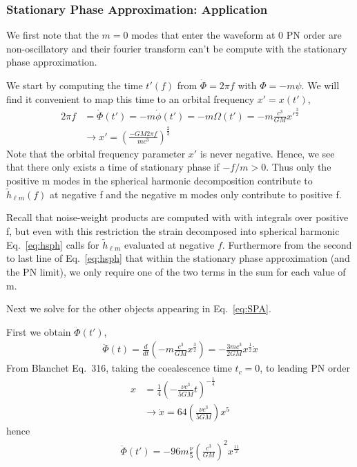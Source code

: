 \documentclass[aps,prd,amsmath,showpacs,amssymb,superscriptaddress,nofootinbib,longbibliography,eqsecnum,preprintnumbers]{revtex4-1}
\begin{document}
\subsubsection{Stationary Phase Approximation: Application}
We first note that the $m=0$ modes that enter the waveform at 0 PN order are non-oscillatory and their fourier transform can't be compute with the stationary phase approximation.

We start by computing the time $t'(f)$ from $\dot \Phi =2\pi f$ with $\Phi =-m\psi$. We will find it convenient to map this time to an orbital frequency $x'=x(t')$,
\begin{align}
2\pi f &=\dot \Phi(t') =-m \dot \phi(t') =-m \Omega(t') =-m \frac{c^3}{GM}x'^{\frac{3}{2}} \nonumber \\
&\to x'=\left(\frac{-GM 2\pi f}{mc^3}\right)^{\frac{2}{3}}
\end{align}
Note that the orbital frequency parameter $x'$ is never negative. Hence, we see that there only exists a time of stationary phase if $-f/m>0$. Thus only the positive m modes in the spherical harmonic decomposition contribute to $\tilde h_{\ell m}(f)$ at negative f and the negative m modes only contribute to positive f.

Recall that noise-weight products are computed with with integrals over positive f, but even with this restriction the strain decomposed into spherical harmonic Eq.~\eqref{eq:hsph} calls for $\tilde h_{\ell m}$ evaluated at negative $f$. Furthermore from the second to last line of Eq.~\eqref{eq:hsph} that within the stationary phase approximation (and the PN limit), we only require one of the two terms in the sum for each value of m.

Next we solve for the other objects appearing in Eq.~\eqref{eq:SPA}.

First we obtain $\ddot \Phi(t')$,
\begin{align}
\ddot \Phi(t)=\frac{d}{dt}\left(-m\frac{c^3}{GM}x^{\frac{3}{2}}\right)=-\frac{3mc^3}{2GM}x^{\frac{1}{2}}\dot x
\end{align}
From Blanchet Eq.~316, taking the coealescence time $t_c=0$, to leading PN order 
\begin{align}
x&=\frac{1}{4}\left( -\frac{\nu c^3}{5GM}t\right)^{-\frac{1}{4}} \label{eq:xt} \\
&\to \dot x=64\left(\frac{\nu c^3}{5GM}\right)x^5
\end{align}
hence
\begin{align}
\ddot \Phi(t')=-96m\frac{\nu}{5}\left(\frac{c^3}{GM}\right)^2x^{\frac{11}{2}}
\end{align}
\end{document}
